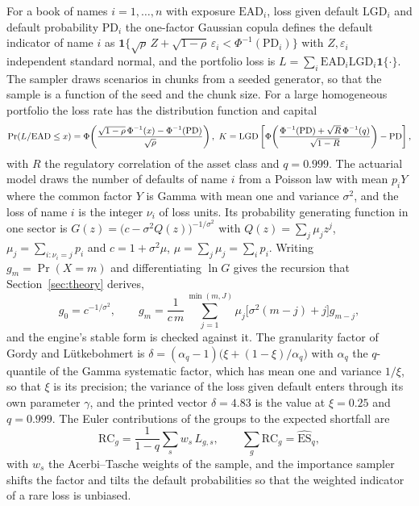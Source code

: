 For a book of names $i=1,\dots,n$ with exposure $\mathrm{EAD}_i$, loss given default $\mathrm{LGD}_i$ and default probability $\mathrm{PD}_i$ the one-factor Gaussian copula defines the default indicator of name $i$ as $\mathbf 1\{\sqrt{\rho}\,Z+\sqrt{1-\rho}\,\varepsilon_i<\Phi^{-1}(\mathrm{PD}_i)\}$ with $Z,\varepsilon_i$ independent standard normal, and the portfolio loss is $L=\sum_i\mathrm{EAD}_i\mathrm{LGD}_i\mathbf 1\{\cdot\}$. The sampler draws scenarios in chunks from a seeded generator, so that the sample is a function of the seed and the chunk size. For a large homogeneous portfolio the loss rate has the distribution function and capital
\begin{equation}
  {\small\begin{gathered}
  \Pr(L/\mathrm{EAD}\le x)=\Phi\!\left(\frac{\sqrt{1-\rho}\,\Phi^{-1}(x)-\Phi^{-1}(\mathrm{PD})}{\sqrt{\rho}}\right),\
  K=\mathrm{LGD}\left[\Phi\!\left(\frac{\Phi^{-1}(\mathrm{PD})+\sqrt{R}\,\Phi^{-1}(q)}{\sqrt{1-R}}\right)-\mathrm{PD}\right],
  \end{gathered}}
  \label{eq:lhp}
\end{equation}
with $R$ the regulatory correlation of the asset class and $q=0.999$. The actuarial model draws the number of defaults of name $i$ from a Poisson law with mean $p_iY$ where the common factor $Y$ is Gamma with mean one and variance $\sigma^2$, and the loss of name $i$ is the integer $\nu_i$ of loss units. Its probability generating function in one sector is $G(z)=\bigl(c-\sigma^2Q(z)\bigr)^{-1/\sigma^2}$ with $Q(z)=\sum_j\mu_jz^j$, $\mu_j=\sum_{i:\nu_i=j}p_i$ and $c=1+\sigma^2\mu$, $\mu=\sum_j\mu_j=\sum_ip_i$. Writing $g_m=\Pr(X=m)$ and differentiating $\ln G$ gives the recursion that Section~\ref{sec:theory} derives,
\begin{equation}
  g_0=c^{-1/\sigma^2},\qquad g_m=\frac{1}{c\,m}\sum_{j=1}^{\min(m,J)}\mu_j\bigl[\sigma^2(m-j)+j\bigr]g_{m-j},
  \label{eq:crp}
\end{equation}
and the engine's stable form is checked against it. The granularity factor of Gordy and L\"utkebohmert is $\delta=(\alpha_q-1)\bigl(\xi+(1-\xi)/\alpha_q\bigr)$ with $\alpha_q$ the $q$-quantile of the Gamma systematic factor, which has mean one and variance $1/\xi$, so that $\xi$ is its precision; the variance of the loss given default enters through its own parameter $\gamma$, and the printed vector $\delta=4.83$ is the value at $\xi=0.25$ and $q=0.999$. The Euler contributions of the groups to the expected shortfall are
\begin{equation}
  \mathrm{RC}_g=\frac{1}{1-q}\sum_{s}w_s\,L_{g,s},\qquad \sum_g\mathrm{RC}_g=\widehat{\mathrm{ES}}_q,
  \label{eq:euler}
\end{equation}
with $w_s$ the Acerbi--Tasche weights of the sample, and the importance sampler shifts the factor and tilts the default probabilities so that the weighted indicator of a rare loss is unbiased.

